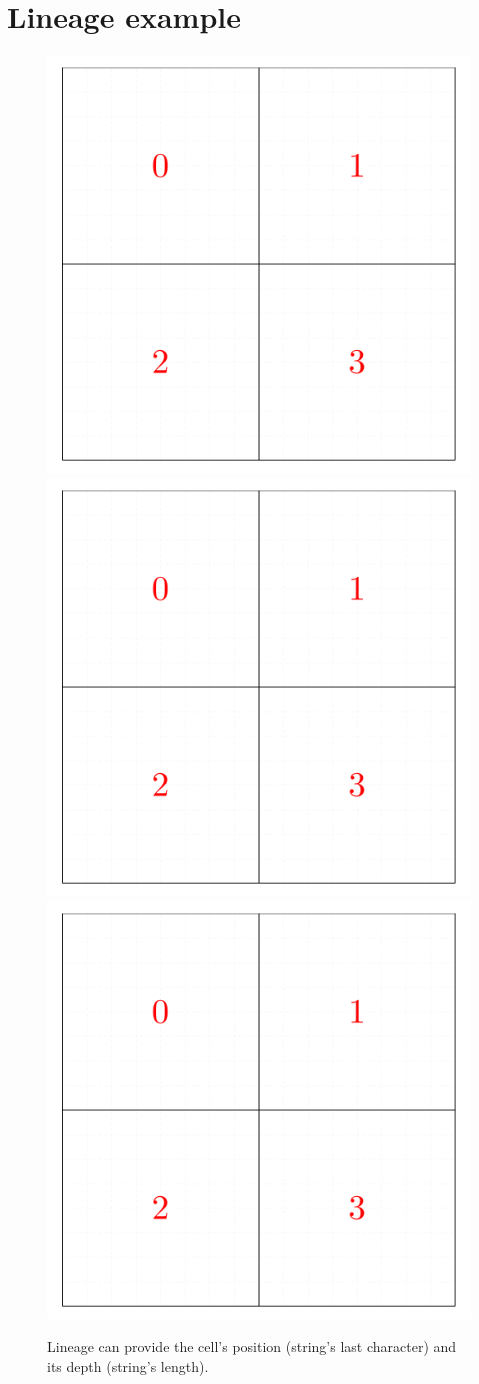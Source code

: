 \section{Lineage example}\label{fig:lineage_example}

\begin{figure}[!ht]\label{fig:lineage}
    \includegraphics[page=1,width=0.32\linewidth]{figures/cellinpolygon/lineage}
    \includegraphics[page=2,width=0.32\linewidth]{figures/cellinpolygon/lineage}
    \includegraphics[page=3,width=0.32\linewidth]{figures/cellinpolygon/lineage}
    \caption{Lineage can provide the cell's position (string's last character) and its depth (string's length).}
\end{figure}

